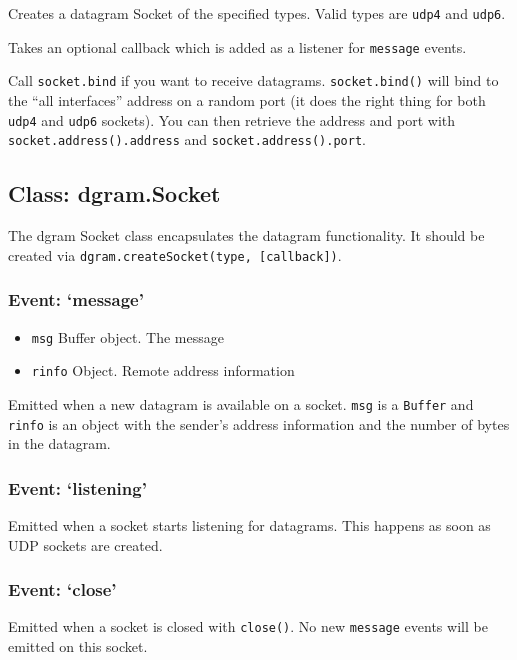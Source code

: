 Creates a datagram Socket of the specified types. Valid types are
\texttt{udp4} and \texttt{udp6}.

Takes an optional callback which is added as a listener for
\texttt{message} events.

Call \texttt{socket.bind} if you want to receive datagrams.
\texttt{socket.bind()} will bind to the ``all interfaces'' address on a
random port (it does the right thing for both \texttt{udp4} and
\texttt{udp6} sockets). You can then retrieve the address and port with
\texttt{socket.address().address} and \texttt{socket.address().port}.

\subsection{Class: dgram.Socket}

The dgram Socket class encapsulates the datagram functionality. It
should be created via \texttt{dgram.createSocket(type, {[}callback{]})}.

\subsubsection{Event: `message'}

\begin{itemize}
\item
  \texttt{msg} Buffer object. The message
\item
  \texttt{rinfo} Object. Remote address information
\end{itemize}

Emitted when a new datagram is available on a socket. \texttt{msg} is a
\texttt{Buffer} and \texttt{rinfo} is an object with the sender's
address information and the number of bytes in the datagram.

\subsubsection{Event: `listening'}

Emitted when a socket starts listening for datagrams. This happens as
soon as UDP sockets are created.

\subsubsection{Event: `close'}

Emitted when a socket is closed with \texttt{close()}. No new
\texttt{message} events will be emitted on this socket.

